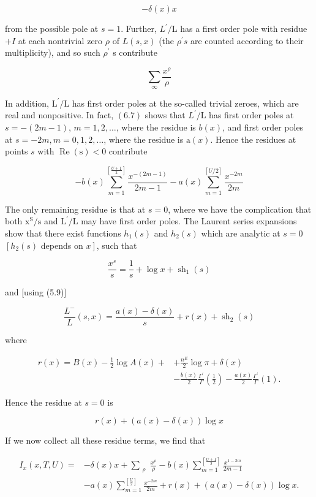 $$
-\delta(x) x
$$

from the possible pole at $s=1$. Further, $L^{\prime} / \mathrm{L}$ has a first order pole with residue $+I$ at each nontrivial zero $\rho$ of $L(s, x)$ (the $\rho^{\prime} s$ are counted according to their multiplicity), and so such $\rho^{\prime}$ s contribute

$$
\sum_{\infty} \frac{x^{\rho}}{\rho}
$$

In addition, $\mathrm{L}^{\prime} / \mathrm{L}$ has first order poles at the so-called trivial zeroes, which are real and nonpositive. In fact, $(6.7)$ shows that $L^{\prime} / \mathrm{L}$ has first order poles at $s=-(2 m-1)$, $m=1,2, \ldots$, where the residue is $b(x)$, and first order poles at $s=-2 m, m=0,1,2, \ldots$, where the residue is $\mathrm{a}(x)$. Hence the residues at points $s$ with $\operatorname{Re}(\mathrm{s})<0$ contribute

$$
-b(x) \sum_{m=1}^{\left[\frac{U+1}{2}\right]} \frac{x^{-(2 m-1)}}{2 m-1}-a(x) \sum_{m=1}^{[U / 2]} \frac{x^{-2 m}}{2 m}
$$

The only remaining residue is that at $s=0$, where we have the complication that both $\mathrm{x}^{\mathrm{S}} / \mathrm{s}$ and $\mathrm{L}^{\prime} / \mathrm{L}$ may have first order poles. The Laurent series expansions show that there exist functions $h_{1}(s)$ and $h_{2}(s)$ which are analytic at $s=0$ $\left[h_{2}(s)\right.$ depends on $\left.x\right]$, such that

$$
\frac{x^{s}}{s}=\frac{1}{s}+\log x+\operatorname{sh}_{1}(s)
$$

and [using (5.9)]

$$
\frac{L^{-}}{L}(s, x)=\frac{a(x)-\delta(x)}{s}+r(x)+\operatorname{sh}_{2}(s)
$$

where

$$
\begin{aligned}
r(x)=B(x)-\frac{1}{2} \log A(x)+&+\frac{n^{E}}{2} \log \pi+\delta(x) \\
&-\frac{b(x)}{2} \frac{\Gamma^{\prime}}{\Gamma}\left(\frac{1}{2}\right)-\frac{a(x)}{2} \frac{\Gamma^{\prime}}{\Gamma}(1) .
\end{aligned}
$$

Hence the residue at $s=0$ is

$$
r(x)+(a(x)-\delta(x)) \log x
$$

If we now collect all these residue terms, we find that

$$
\begin{aligned}
I_{x}(x, T, U)=&-\delta(x) x+\sum_{\substack{\rho}} \frac{x^{\rho}}{\rho}-b(x) \sum_{m=1}^{\left[\frac{U+I}{2}\right]} \frac{x^{1-2 m}}{2 m-1} \\
&-a(x) \sum_{m=1}^{\left[\frac{U}{2}\right]} \frac{x^{-2 m}}{2 m}+r(x)+(a(x)-\delta(x)) \log x .
\end{aligned}
$$

